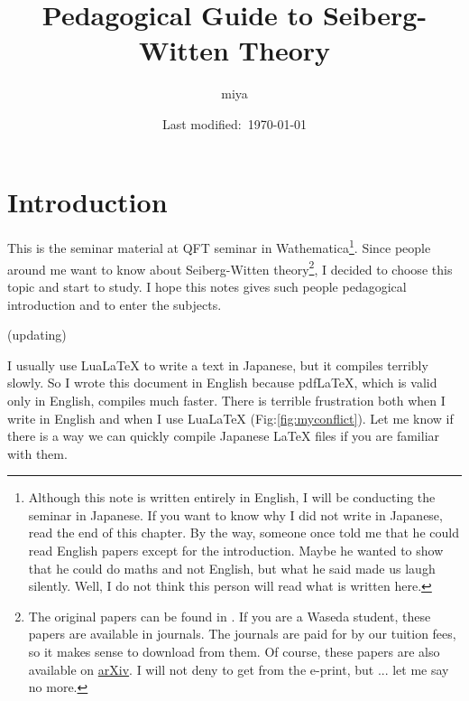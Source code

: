 \documentclass[a4paper,pdftex,10pt]{article}
\begin{document}
\title{
  Pedagogical Guide to Seiberg-Witten Theory
}
\author{
  miya
}
\date{Last modified:\ \today}

\maketitle

\tableofcontents

\clearpage
\section{Introduction}

This is the seminar material at QFT seminar in Wathematica\footnote{
  Although this note is written entirely in English, I will be conducting the seminar in Japanese. If you want to know why I did not write in Japanese, read the end of this chapter. By the way, someone once told me that he could read English papers except for the introduction. Maybe he wanted to show that he could do maths and not English, but what he said made us laugh silently. Well, I do not think this person will read what is written here.
}. Since people around me want to know about Seiberg-Witten theory\footnote{
  The original papers can be found in \cite{Seiberg:1994rs, Seiberg:1994aj}. If you are a Waseda student, these papers are available in journals. The journals are paid for by our tuition fees, so it makes sense to download from them. Of course, these papers are also available on \href{https://arxiv.org}{arXiv}. I will not deny to get from the e-print, but ... let me say no more.
}, I decided to choose this topic and start to study. I hope this notes gives such people pedagogical introduction and to enter the subjects.

\vspace*{10pt}

(updating)

\vspace*{10pt}

\begin{graybox}
  I usually use Lua{\LaTeX} to write a text in Japanese, but it compiles terribly slowly. So I wrote this document in English because pdf{\LaTeX}, which is valid only in English, compiles much faster. There is terrible frustration both when I write in English and when I use Lua{\LaTeX} (Fig:\ref{fig:myconflict}). Let me know if there is a way we can quickly compile Japanese {\LaTeX} files if you are familiar with them.
\end{graybox}
\end{document}
